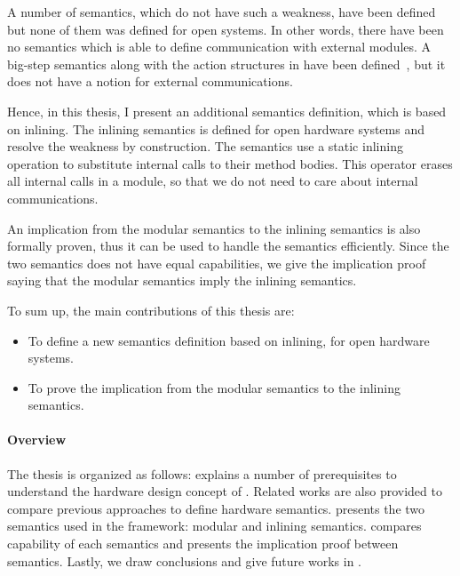 A number of semantics, which do not have such a weakness, have been
defined but none of them was defined for open systems. In other words,
there have been no semantics which is able to define communication
with external modules. A big-step semantics along with the action
structures in \Bluespec{} have been defined~\cite{nirav-memocode}, but
it does not have a notion for external communications.

Hence, in this thesis, I present an additional semantics definition,
which is based on inlining.  The inlining semantics is defined for
open hardware systems and resolve the weakness by construction.  The
semantics use a static inlining operation to substitute internal calls
to their method bodies. This operator erases all internal calls in a
module, so that we do not need to care about internal communications.

An implication from the modular semantics to the inlining semantics is
also formally proven, thus it can be used to handle the semantics
efficiently. Since the two semantics does not have equal capabilities,
we give the implication proof saying that the modular semantics imply
the inlining semantics.

To sum up, the main contributions of this thesis are:
\begin{itemize}
\item To define a new semantics definition based on inlining, for open
  hardware systems.
\item To prove the implication from the modular semantics to the
  inlining semantics.
\end{itemize}

\paragraph{Overview}

The thesis is organized as follows: 
explains a number of prerequisites to understand the hardware design
concept of \Bluespec{}. Related works are also provided to compare
previous approaches to define hardware
semantics.  presents the two semantics used in
the \Kami{} framework: modular and inlining
semantics.  compares capability of each
semantics and presents the implication proof between
semantics. Lastly, we draw conclusions and give future works in
.





